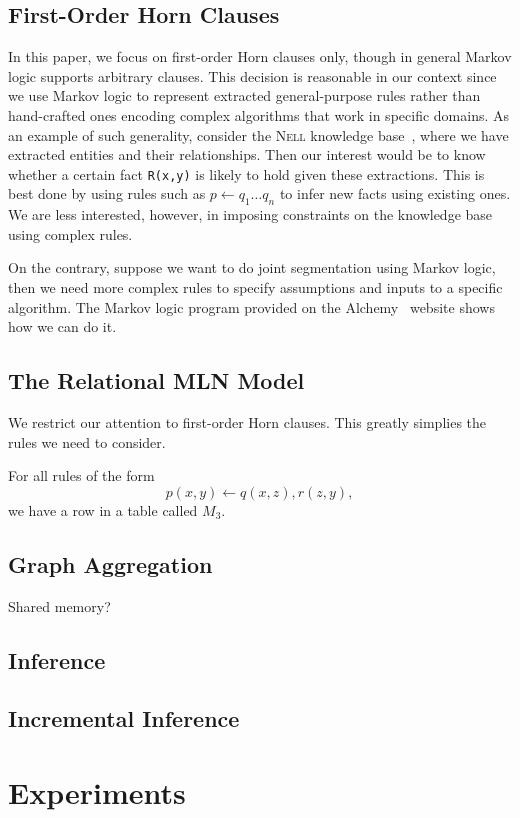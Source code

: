 \documentclass{vldb}
\newcommand{\nell}{\textsc{Nell}\xspace}
\begin{document}
\subsection{First-Order Horn Clauses}
In this paper, we focus on first-order Horn clauses only, though in general Markov logic supports arbitrary clauses. This decision is reasonable in our context since we use Markov logic to represent extracted general-purpose rules rather than hand-crafted ones encoding complex algorithms that work in specific domains. As an example of such generality, consider the \nell knowledge base~\cite{}, where we have extracted entities and their relationships. Then our interest would be to know whether a certain fact \texttt{R(x,y)} is likely to hold given these extractions. This is best done by using rules such as $p\leftarrow q_1\ldots q_n$ to infer new facts using existing ones. We are less interested, however, in imposing constraints on the knowledge base using complex rules.

On the contrary, suppose we want to do joint segmentation using Markov logic, then we need more complex rules to specify assumptions and inputs to a specific algorithm. The Markov logic program provided on the Alchemy~\cite{} website shows how we can do it. 

\subsection{The Relational MLN Model}
We restrict our attention to first-order Horn clauses. This greatly simplies the rules we need to consider.

For all rules of the form $$p(x,y)\leftarrow q(x,z), r(z,y),$$ we have a row in a table called $M_3$.

\subsection{Graph Aggregation}
Shared memory?

\subsection{Inference}

\subsection{Incremental Inference}

\section{Experiments}
\end{document}
